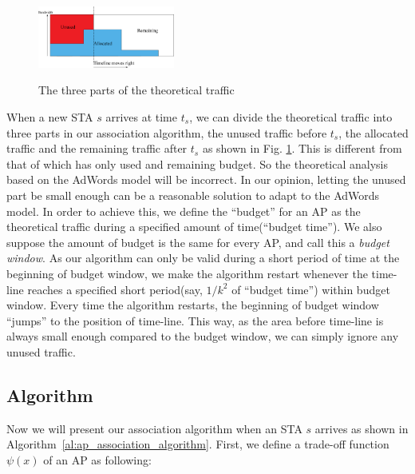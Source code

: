 \documentclass[conference]{IEEEtran}
\def\figwidth{0.4\textwidth}
\begin{document}
  \begin{figure}[!ht]
    \centering
    \includegraphics[width=\figwidth]{Three_parts.eps}\\
    \caption{The three parts of the theoretical traffic}\label{fig:Three_parts}
  \end{figure}
  
  When a new STA $s$ arrives at time $t_s$, we can divide the theoretical traffic into three parts in our association algorithm, the unused traffic before $t_s$, the allocated traffic and the remaining traffic after $t_s$ as shown in Fig. \ref{fig:Three_parts}. This is different from that of \cite{Mehta:2007} which has only used and remaining budget. So the theoretical analysis based on the AdWords model will be incorrect. In our opinion, letting the unused part be small enough can be a reasonable solution to  adapt to the AdWords model. In order to achieve this, we define the ``budget'' for an AP as the theoretical traffic during a specified amount of time(``budget time''). We also suppose the amount of budget is the same for every AP, and call this a \emph{budget window}. As our algorithm can only be valid during a short period of time at the beginning of budget window, we make the algorithm restart whenever the time-line reaches a specified short period(say, $1/k^2$ of ``budget time'') within budget window. Every time the algorithm restarts, the beginning of budget window ``jumps'' to the position of time-line. This way, as the area before time-line is always small enough compared to the budget window, we can simply ignore any unused traffic.





  \subsection{Algorithm}
  Now we will present our association algorithm when an STA $s$ arrives as shown in Algorithm~\ref{al:ap_association_algorithm}.  First, we define a trade-off function $\psi(x)$ of an AP as following:
\end{document}
